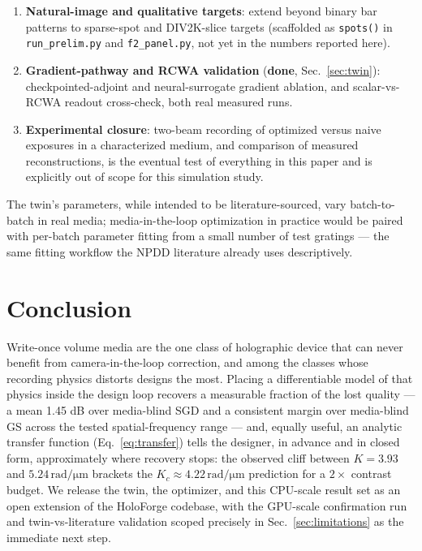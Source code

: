 \documentclass[conference]{IEEEtran}
\begin{document}
\begin{enumerate}
individually in the table), and $\kappa$ remains a model-calibration target,
not a literature constant, throughout.
\item \textbf{Natural-image and qualitative targets}: extend beyond binary
bar patterns to sparse-spot and DIV2K-slice targets (scaffolded as
\texttt{spots()} in \texttt{run\_prelim.py} and \texttt{f2\_panel.py}, not
yet in the numbers reported here).
\item \textbf{Gradient-pathway and RCWA validation} (\textbf{done},
Sec.~\ref{sec:twin}): checkpointed-adjoint and neural-surrogate gradient
ablation, and scalar-vs-RCWA readout cross-check, both real measured runs.
\item \textbf{Experimental closure}: two-beam recording of optimized versus
naive exposures in a characterized medium, and comparison of measured
reconstructions, is the eventual test of everything in this paper and is
explicitly out of scope for this simulation study.
\end{enumerate}
The twin's parameters, while intended to be literature-sourced, vary
batch-to-batch in real media; media-in-the-loop optimization in practice
would be paired with per-batch parameter fitting from a small number of test
gratings — the same fitting workflow the NPDD literature already uses
descriptively.

\section{Conclusion}
Write-once volume media are the one class of holographic device that can
never benefit from camera-in-the-loop correction, and among the classes whose
recording physics distorts designs the most. Placing a differentiable model
of that physics inside the design loop recovers a measurable fraction of the
lost quality — a mean 1.45 dB over media-blind SGD and a consistent margin
over media-blind GS across the tested spatial-frequency range — and, equally
useful, an analytic transfer function (Eq.~\ref{eq:transfer}) tells the
designer, in advance and in closed form, approximately where recovery stops:
the observed cliff between $K=3.93$ and $5.24\,\mathrm{rad/\mu m}$ brackets
the $K_c \approx 4.22\,\mathrm{rad/\mu m}$ prediction for a $2\times$ contrast
budget. We release the twin, the optimizer, and this CPU-scale result set as
an open extension of the HoloForge codebase, with the GPU-scale confirmation
run and twin-vs-literature validation scoped precisely in
Sec.~\ref{sec:limitations} as the immediate next step.
\end{document}
